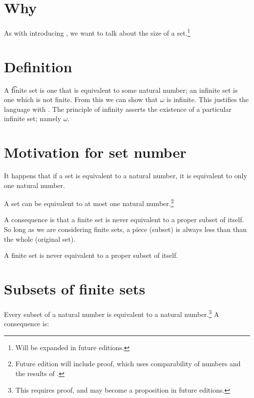 

\section*{Why}

As with introducing , we want to talk about the size of a set.\footnote{Will be expanded in future editions.}

\section*{Definition}

A \t{finite} set is one that is equivalent to some natural number; an infinite set is one which is not finite.
From this we can show that $\omega $ is infinite.
This justifies the language  with .
The principle of infinity asserts the existence of a particular infinite set; namely $\omega $.

\section*{Motivation for set number}

It happens that if a set is equivalent to a natural number, it is equivalent to only one natural number.

\begin{proposition}
A set can be equivalent to at most one natural number.\footnote{Future edition will include proof, which uses comparability of numbers and the results of .}\end{proposition}
A consequence is that a finite set is never equivalent to a proper subset of itself.
So long as we are considering finite sets, a piece (subset) is always less than than the whole (original set).

\begin{proposition}
A finite set is never equivalent to a proper subset of itself.\end{proposition}
\section*{Subsets of finite sets}

Every subset of a natural number is equivalent to a natural number.\footnote{This requires proof, and may become a proposition in future editions.}
A consequence is:

